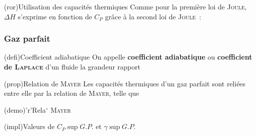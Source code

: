 \documentclass[../../main/main.tex]{subfiles}
\begin{document}
\begin{tcb*}(ror){Utilisation des capacités thermiques}
	Comme pour la première loi de \textsc{Joule}, $\Delta{H}$ s'exprime en
	fonction de $C_P$ grâce à la second loi de \textsc{Joule}~:
	\vspace{-15pt}
	\vspace{-15pt}
\end{tcb*}

\subsubsection{Gaz parfait}
\begin{tcb*}(defi){Coefficient adiabatique}
	On appelle \textbf{coefficient adiabatique} ou \textbf{coefficient de
		\textsc{Laplace}} d'un fluide la grandeur
	rapport
	\psw{%
		\[
			\boxed{\gamma = \frac{C_P}{C_V}}
		\]
	}%
\end{tcb*}

\begin{tcbraster}[raster equal height=rows, raster columns=2]
	\begin{tcb*}(prop){Relation de \textsc{Mayer}}
		Les capacités thermiques d'un gaz parfait sont reliées entre elle par la
		relation de \textsc{Mayer}, telle que
		\psw{%
			\[
				\boxed{C_P = C_V + nR}
			\]
		}%
		\vspace{-15pt}
	\end{tcb*}
	\begin{tcb*}[%
			list entry={\hspace*{-20pt}\protect\rcheck~~Relation de \textsc{Mayer}}%
		](demo)'r'{Rela$^\circ$ \textsc{Mayer}}
		\psw{%
			\[
				H = U + nRT
				\Ra
				\dv{H}{T} = \dv{U}{T} + nR
				\qed
			\]
		}%
		\vspace{-15pt}
	\end{tcb*}
\end{tcbraster}

\begin{tcb*}[sidebyside,
		sidebyside align=top](impl){Valeurs de $C_P\sup{G.P.}$ et $\gamma\sup{G.P.}$}
	\tcblower
\end{tcb*}
\end{document}
